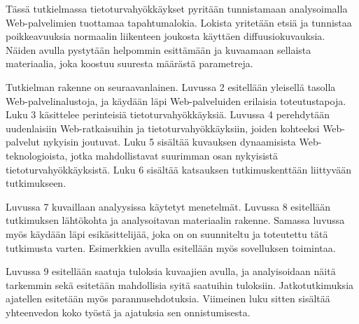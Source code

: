 Tässä tutkielmassa tietoturvahyökkäykset pyritään tunnistamaan analysoimalla 
Web-palvelimien tuottamaa tapahtumalokia. Lokista yritetään etsiä ja tunnistaa
poikkeavuuksia normaalin liikenteen joukosta käyttäen diffuusiokuvauksia. Näiden
avulla pystytään helpommin esittämään ja kuvaamaan sellaista materiaalia, joka 
koostuu suuresta määrästä parametreja.

Tutkielman rakenne on seuraavanlainen. Luvussa 2 esitellään yleisellä
tasolla Web-palvelinalustoja, ja käydään läpi Web-palveluiden
erilaisia toteutustapoja. Luku 3 käsittelee perinteisiä
tietoturvahyökkäyksiä. Luvussa 4 perehdytään uudenlaisiin
Web-ratkaisuihin ja tietoturvahyökkäyksiin, joiden kohteeksi
Web-palvelut nykyisin joutuvat.  Luku 5 sisältää kuvauksen
dynaamisista Web-teknologioista, jotka mahdollistavat suurimman osan
nykyisistä tietoturvahyökkäyksistä. Luku 6 sisältää katsauksen
tutkimuskenttään liittyvään tutkimukseen.

Luvussa 7 kuvaillaan analyysissa käytetyt menetelmät. Luvussa 8
esitellään tutkimuksen lähtökohta ja analysoitavan materiaalin rakenne.
Samassa luvussa myös käydään läpi esikäsittelijää, joka on on suunniteltu 
ja toteutettu tätä tutkimusta varten. Esimerkkien avulla esitellään myös 
sovelluksen toimintaa.

Luvussa 9 esitellään saatuja tuloksia kuvaajien avulla, ja
analyisoidaan näitä tarkemmin sekä esitetään mahdollisia syitä
saatuihin tuloksiin. Jatkotutkimuksia ajatellen esitetään
myös parannusehdotuksia. Viimeinen luku sitten sisältää
yhteenvedon koko työstä ja ajatuksia sen onnistumisesta.
